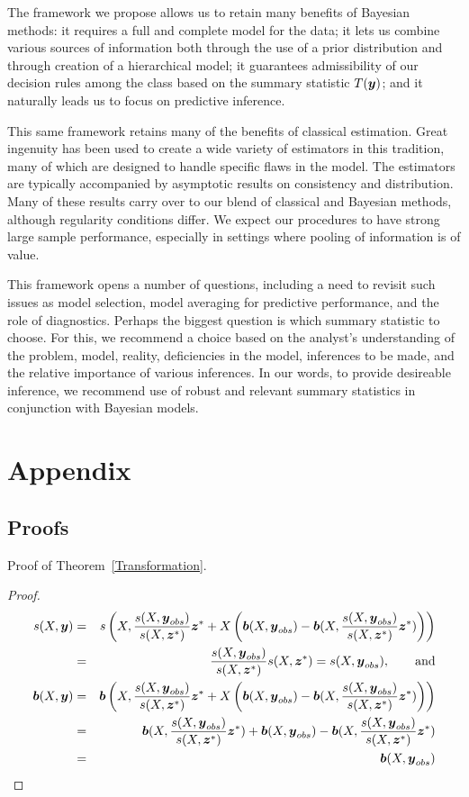 \documentclass[12pt]{article}
\newcommand{\by}{\mbox{\boldmath $y$}}
\newcommand{\bz}{\mbox{\boldmath $z$}}
\newcommand{\bb}{\mbox{\boldmath $b$}}
\newcommand{\green}[1]{{\color{green}#1}}
\begin{document}
The framework we propose allows us to retain many benefits of Bayesian methods:  it requires a full and complete model for the data; it lets us combine various sources of information both through the use of a prior distribution and through creation of a hierarchical model; it guarantees admissibility of our decision rules among the class based on the summary statistic $T(\by)$; and it naturally leads us to focus on predictive inference.   

This same framework retains many of the benefits of classical estimation.  Great ingenuity has been used to create a wide variety of estimators in this tradition, many of which are designed to handle specific flaws in the model.  The estimators are typically accompanied by asymptotic results on consistency and distribution.  Many of these results carry over to our blend of classical and Bayesian methods, although regularity conditions differ.  We expect our procedures to have strong large sample performance, especially in settings where
pooling of information is of value.  

This framework opens a number of questions, including a need to revisit such issues as model selection, model averaging for predictive performance, and the role of diagnostics.  Perhaps the biggest question is which summary statistic to choose.  For this, we recommend a choice based on the analyst's understanding of the problem, model, reality, deficiencies in the model,  inferences to be made, and the relative importance of various inferences.  \green{In our words, to provide desireable inference, we recommend use of robust and relevant summary statistics in conjunction with Bayesian models.}  


\section{Appendix}
\label{sec:appendix}
\subsection{Proofs}
\noindent

Proof of Theorem~\ref{Transformation}.  
\begin{proof} 
\begin{eqnarray}
 s(X,\by) & = & s\left(X,\frac{s(X,\by_{obs})}{s(X,\bz^*)}\bz^* + X\left(\bb(X,\by_{obs}) - \bb(X,\frac{s(X,\by_{obs})}{s(X,\bz^*)}\bz^*)\right)\right) \\
& = & \frac{s(X,\by_{obs})}{s(X,\bz^*)} s(X, \bz^*)= s(X,\by_{obs}) , \qquad \mbox{and} \\
 \bb(X,\by) & = & \bb\left(X,\frac{s(X,\by_{obs})}{s(X,\bz^*)}\bz^* + X\left(\bb(X,\by_{obs}) - \bb(X,\frac{s(X,\by_{obs})}{s(X,\bz^*)}\bz^*)\right)\right) \\
 & = & \bb(X,\frac{s(X,\by_{obs})}{s(X,\bz^*)}\bz^*) + \bb(X,\by_{obs}) - \bb(X,\frac{s(X,\by_{obs})}{s(X,\bz^*)}\bz^*) \\ &=& \bb(X,\by_{obs})
\end{eqnarray}
\end{proof}
\end{document}
